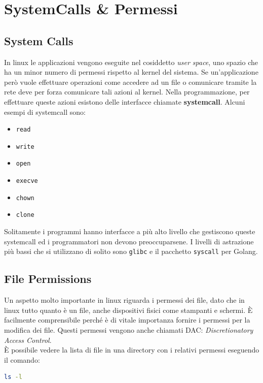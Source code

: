 \chapter{SystemCalls \& Permessi}

\section{System Calls}

In linux le applicazioni vengono eseguite nel cosiddetto \textit{user space},
uno spazio che ha un minor numero di permessi rispetto al kernel del sistema.
Se un'applicazione però vuole effettuare operazioni come accedere ad un file
o comunicare tramite la rete deve per forza comunicare tali azioni al kernel.
Nella programmazione, per effettuare queste azioni esistono delle interfacce
chiamate \textbf{systemcall}. Alcuni esempi di systemcall sono:

\begin{itemize}
    \item \verb|read|
    \item \verb|write|
    \item \verb|open|
    \item \verb|execve|
    \item \verb|chown|
    \item \verb|clone|
\end{itemize}

Solitamente i programmi hanno interfacce a più alto livello che gestiscono queste
systemcall ed i programmatori non devono preoccuparsene. I livelli di astrazione
più bassi che si utilizzano di solito sono \verb|glibc| e il pacchetto
\verb|syscall| per Golang.

\section{File Permissions}

Un aspetto molto importante in linux riguarda i permessi dei file, dato che in
linux tutto quanto è un file, anche dispositivi fisici come stampanti e schermi.
È facilmente comprensibile perché è di vitale importanza fornire i permessi per
la modifica dei file. Questi permessi vengono anche chiamati DAC:
\textit{Discretionatory Access Control}.\\

È possibile vedere la lista di file in una directory con i relativi permessi
eseguendo il comando:

\begin{lstlisting}[language=Bash]
    ls -l
\end{lstlisting}

